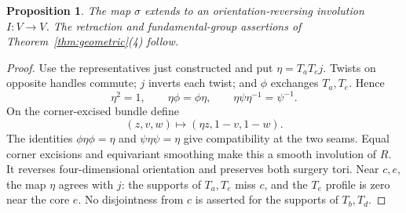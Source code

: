 \documentclass[11pt]{amsart}
\newtheorem{proposition}[theorem]{Proposition}
\theoremstyle{definition}
\theoremstyle{remark}
\begin{document}
\begin{proposition}\label{prop:extension}
The map $\sigma$ extends to an orientation-reversing involution
$I:V\to V$. The retraction and fundamental-group assertions of
Theorem~\ref{thm:geometric}(4) follow.
\end{proposition}
\begin{proof}
Use the representatives just constructed and put $\eta=T_aT_ej$.
Twists on opposite handles commute; $j$ inverts each twist; and
$\phi$ exchanges $T_a,T_e$. Hence
\begin{equation}\label{eq:eta}
       \eta^2=1,\qquad \eta\phi=\phi\eta,
       \qquad \eta\psi\eta^{-1}=\psi^{-1}.
\end{equation}
On the corner-excised bundle define
\begin{equation}\label{eq:I}
                   (z,v,w)\longmapsto(\eta z,1-v,1-w).
\end{equation}
The identities $\phi\eta\phi=\eta$ and $\psi\eta\psi=\eta$
give compatibility at the two seams. Equal corner excisions and
equivariant smoothing make this a smooth involution of $R$.
It reverses four-dimensional orientation and preserves both surgery
tori. Near $c,e$, the map $\eta$ agrees with $j$: the supports of
$T_a,T_e$ miss $c$, and the $T_e$ profile is zero near the core $e$.
No disjointness from $c$ is asserted for the supports of $T_b,T_d$.


\end{proof}
\end{document}
